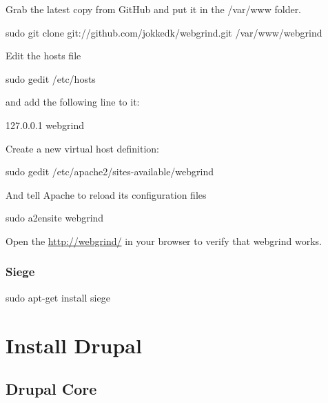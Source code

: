 \documentclass[ebook,10pt,twoside,openright]{memoir}
\begin{document}
Grab the latest copy from GitHub and put it in the /var/www folder.

\begin{squashboxcommand}
sudo git clone git://github.com/jokkedk/webgrind.git /var/www/webgrind
\end{squashboxcommand}

Edit the hosts file

\begin{squashboxcommand}
sudo gedit /etc/hosts
\end{squashboxcommand}

and add the following line to it:

\begin{squashboxoutput}
127.0.0.1   webgrind
\end{squashboxoutput}

Create a new virtual host definition:

\begin{squashboxcommand}
sudo gedit /etc/apache2/sites-available/webgrind
\end{squashboxcommand}

And tell Apache to reload its configuration files

\begin{squashboxcommand}
sudo a2ensite webgrind
\end{squashboxcommand}

Open the \url{http://webgrind/} in your browser to verify that webgrind works.

\subsection{Siege}

\begin{squashboxcommand}
sudo apt-get install siege
\end{squashboxcommand}

\chapter{Install Drupal} \label{chinstalldrupal}

\section{Drupal Core}
\end{document}
